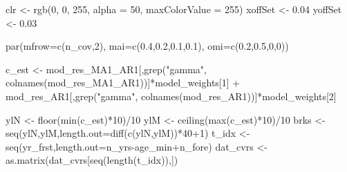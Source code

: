 \documentclass[
  11pt,
]{article}
\newenvironment{Shaded}{}{}
\newcommand{\DataTypeTok}[1]{#1}
\newcommand{\DecValTok}[1]{#1}
\newcommand{\FloatTok}[1]{#1}
\newcommand{\KeywordTok}[1]{\textcolor[rgb]{0.00,0.00,1.00}{#1}}
\newcommand{\NormalTok}[1]{#1}
\newcommand{\OperatorTok}[1]{#1}
\newcommand{\StringTok}[1]{\textcolor[rgb]{0.00,0.50,0.50}{#1}}
\begin{document}
\begin{Shaded}
\begin{Highlighting}[]
\NormalTok{clr <-}\StringTok{ }\KeywordTok{rgb}\NormalTok{(}\DecValTok{0}\NormalTok{, }\DecValTok{0}\NormalTok{, }\DecValTok{255}\NormalTok{, }\DataTypeTok{alpha =} \DecValTok{50}\NormalTok{, }\DataTypeTok{maxColorValue =} \DecValTok{255}\NormalTok{)}
\NormalTok{xoffSet <-}\StringTok{ }\FloatTok{0.04}
\NormalTok{yoffSet <-}\StringTok{ }\FloatTok{0.03}

\KeywordTok{par}\NormalTok{(}\DataTypeTok{mfrow=}\KeywordTok{c}\NormalTok{(n_cov,}\DecValTok{2}\NormalTok{), }\DataTypeTok{mai=}\KeywordTok{c}\NormalTok{(}\FloatTok{0.4}\NormalTok{,}\FloatTok{0.2}\NormalTok{,}\FloatTok{0.1}\NormalTok{,}\FloatTok{0.1}\NormalTok{), }\DataTypeTok{omi=}\KeywordTok{c}\NormalTok{(}\FloatTok{0.2}\NormalTok{,}\FloatTok{0.5}\NormalTok{,}\DecValTok{0}\NormalTok{,}\DecValTok{0}\NormalTok{))}

\NormalTok{c_est <-}\StringTok{ }\NormalTok{mod_res_MA1_AR1[,}\KeywordTok{grep}\NormalTok{(}\StringTok{"gamma"}\NormalTok{, }\KeywordTok{colnames}\NormalTok{(mod_res_MA1_AR1))]}\OperatorTok{*}\NormalTok{model_weights[}\DecValTok{1}\NormalTok{] }\OperatorTok{+}\StringTok{ }\NormalTok{mod_res_AR1[,}\KeywordTok{grep}\NormalTok{(}\StringTok{"gamma"}\NormalTok{, }\KeywordTok{colnames}\NormalTok{(mod_res_AR1))]}\OperatorTok{*}\NormalTok{model_weights[}\DecValTok{2}\NormalTok{] }

\NormalTok{ylN <-}\StringTok{ }\KeywordTok{floor}\NormalTok{(}\KeywordTok{min}\NormalTok{(c_est)}\OperatorTok{*}\DecValTok{10}\NormalTok{)}\OperatorTok{/}\DecValTok{10}
\NormalTok{ylM <-}\StringTok{ }\KeywordTok{ceiling}\NormalTok{(}\KeywordTok{max}\NormalTok{(c_est)}\OperatorTok{*}\DecValTok{10}\NormalTok{)}\OperatorTok{/}\DecValTok{10}
\NormalTok{brks <-}\StringTok{ }\KeywordTok{seq}\NormalTok{(ylN,ylM,}\DataTypeTok{length.out=}\KeywordTok{diff}\NormalTok{(}\KeywordTok{c}\NormalTok{(ylN,ylM))}\OperatorTok{*}\DecValTok{40}\OperatorTok{+}\DecValTok{1}\NormalTok{)}
\NormalTok{t_idx <-}\StringTok{ }\KeywordTok{seq}\NormalTok{(yr_frst,}\DataTypeTok{length.out=}\NormalTok{n_yrs}\OperatorTok{-}\NormalTok{age_min}\OperatorTok{+}\NormalTok{n_fore)}
\NormalTok{dat_cvrs <-}\StringTok{ }\KeywordTok{as.matrix}\NormalTok{(dat_cvrs[}\KeywordTok{seq}\NormalTok{(}\KeywordTok{length}\NormalTok{(t_idx)),])}


\end{Highlighting}
\end{Shaded}
\end{document}
